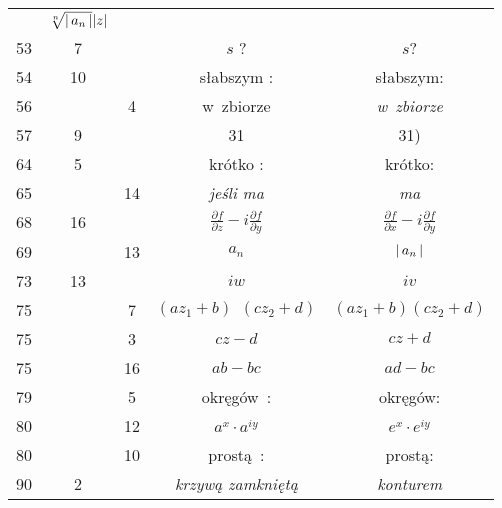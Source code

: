 \documentclass[a4paper,11pt]{article}
\begin{document}
\begin{center}
\begin{tabular}{|c|c|c|c|c|}
           & $\sqrt[n]{ |\, {  a_{ n }  } \,| } | z |$ \\
    53  &  7 & & $s$ ? & $s$? \\
    54  & 10 & & słabszym : & słabszym: \\
    56  & &  4 & w~zbiorze & \textit{w~zbiorze} \\
    57  &  9 & & 31 & 31) \\
    64  &  5 & & krótko : & krótko: \\
    65  & & 14 & \textit{jeśli ma} & \textit{ma} \\
    68  & 16 & & $\frac{ \partial f }{ \partial z } - i \frac{ \partial f }{ \partial y }$
           & $\frac{ \partial f }{ \partial x } - i \frac{ \partial f }{ \partial y }$ \\
    69  & & 13 & $a_{ n }$ & $|\, {  a_{ n }  } \,|$ \\
    73  & 13 & & $iw$ & $iv$ \\
    75  & &  7 & $( a z_{ 1 } + b )\;\, ( c z_{ 2 } + d )$
           & $( a z_{ 1 } + b ) ( c z_{ 2 } + d )$ \\
    75  & &  3 & $c z - d$ & $c z + d$ \\
    75  & & 16 & $ab - bc$ & $ad - bc$ \\
    79  & &  5 & okręgów~: & okręgów: \\
    80  & & 12 & $a^{ x } \cdot a^{ iy }$ & $e^{ x } \cdot e^{ iy }$ \\
    80  & & 10 & prostą~: & prostą: \\
    90  &  2 & & \textit{krzywą zamkniętą} & \textit{konturem} \\
    \hline
  \end{tabular}





  \newpage


\end{center}
\end{document}
